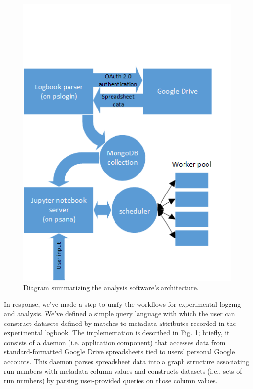 \begin{figure}[h] \label{uwxap_block}
\caption{Diagram summarizing the analysis software's architecture.}
\centering
\includegraphics[scale=0.90]{../Figures/UWXAP_block_diagram.png}
\end{figure}

In response, we've made a step to unify the workflows for experimental logging and analysis. We've defined a simple query language with which the user can construct datasets defined by matches to metadata attributes recorded in the experimental logbook. The implementation is described in Fig. \ref{uwxap_block}; briefly, it consists of a daemon (i.e. application component) that accesses data from standard-formatted Google Drive spreadsheets tied to users' personal Google accounts. This daemon parses spreadsheet data into a graph structure associating run numbers with metadata column values and constructs datasets (i.e., sets of run numbers) by parsing user-provided queries on those column values. 

